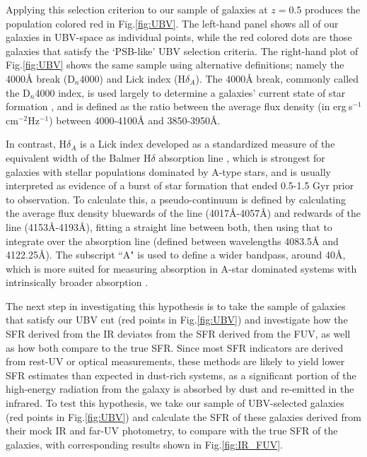 \documentclass[twocolumn, linenumbers]{aastex631}
\renewcommand{\fig}{Fig.\hspace{.2em}}
\begin{document}
Applying this selection criterion to our sample of galaxies at $z=0.5$ produces the population colored red in \fig \ref{fig:UBV}.  The left-hand panel shows all of our galaxies in UBV-space as individual points, while the red colored dots are those galaxies that satisfy the `PSB-like' UBV selection criteria.  The right-hand plot of \fig \ref{fig:UBV} shows the same sample using alternative definitions; namely the 4000\r{A} break (D$_n$4000) and Lick index (H$\delta_A$).  The 4000\r{A} break, commonly called the D$_n$4000 index, is used largely to determine a galaxies' current state of star formation \citep{dn4000}, and is defined as the ratio between the average flux density (in erg$~$s$^{-1}$cm$^{-2}$Hz$^{-1}$) between 4000-4100\r{A} and  3850-3950\r{A}. 

In contrast, H$\delta_A$ is a Lick index developed as a standardized measure of the equivalent width of the Balmer H$\delta$ absorption line \citep{hdelta}, which is strongest for galaxies with stellar populations dominated by A-type stars, and is usually interpreted as evidence of a burst of star formation that ended 0.5-1.5 Gyr prior to observation. To calculate this, a pseudo-continuum is defined by calculating the average flux density bluewards of the line (4017\r{A}-4057\r{A}) and redwards of the line (4153\r{A}-4193\r{A}), fitting a straight line between both, then using that to integrate over the absorption line (defined between wavelengths 4083.5\r{A} and 4122.25\r{A}).  The subscript ``A" is used to define a wider bandpass, around 40\r{A}, which is more suited for measuring absorption in A-star dominated systems with intrinsically broader absorption \citep{hdelta}.

The next step in investigating this hypothesis is to take the sample of galaxies that satisfy our UBV cut (red points in \fig \ref{fig:UBV}) and investigate how the SFR derived from the IR deviates from the SFR derived from the FUV, as well as how both compare to the true SFR.  Since most SFR indicators are derived from rest-UV or optical measurements, these methods are likely to yield lower SFR estimates than expected in dust-rich systems, as a significant portion of the high-energy radiation from the galaxy is absorbed by dust and re-emitted in the infrared.  To test this hypothesis, we take our sample of UBV-selected galaxies (red points in \fig \ref{fig:UBV}) and calculate the SFR of these galaxies derived from their mock IR and far-UV photometry, to compare with the true SFR of the galaxies, with corresponding results shown in \fig \ref{fig:IR_FUV}.
\end{document}
